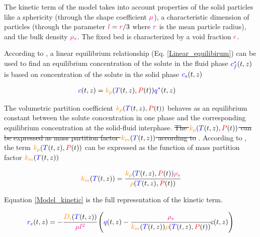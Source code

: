 \documentclass[../Article_Model_Parameters.tex]{subfiles}
\begin{document}
			{\color{blue} The kinetic term of the model takes into account properties of the solid particles like a sphericity (through the shape coefficient ${\color{magenta}\mu}$), a characteristic dimension of particles (through the parameter ${\color{magenta}l} = {\color{magenta}r}/3$ where ${\color{magenta}r}$ is the mean particle radius), and the bulk density ${\color{magenta}\rho_s}$. The fixed bed is characterized by a void fraction ${\color{magenta}\epsilon}$. }
			
			According to \citet{Bulley1984}, a linear equilibrium relationship (Eq.  \ref{Linear_equilibirum}) can be used to find an equilibrium concentration of the solute in the fluid phase ${\color{blue}c_f^*}(t,z)$ is based on concentration of the solute in the solid phase ${\color{blue}c_s}(t,z)$ 
			
			{\footnotesize
				\begin{align} \label{Linear_equilibirum}
					{\color{blue}c}(t,z) &= {\color{orange}k_p}({\color{blue}T}(t,z),{\color{red}P}(t)) \allowbreak {\color{blue}q^*}(t,z)
			\end{align} }
			
			The volumetric partition coefficient ${\color{orange}k_p}({\color{blue}T}(t,z),{\color{red}P}(t))$ behaves as an equilibrium constant between the solute concentration in one phase and the corresponding equilibrium concentration at the solid-fluid interphase. \sout{ The ${\color{orange}k_p}({\color{blue}T}(t,z),{\color{red}P}(t))$ can be expressed as mass partition factor ${\color{orange}k_m}({\color{blue}T}(t,z))$ according to} \citet{Spiro2007} .
			{\color{blue} According to \citet{Spiro2007}, the term ${\color{orange}k_p}({\color{blue}T}(t,z),{\color{red}P}(t))$ can be expressed as the function of mass partition factor ${\color{orange}k_m}({\color{blue}T}(t,z))$ } 
			
			{\footnotesize
				\begin{align}
					{\color{orange}k_m}({\color{blue}T}(t,z)) = \cfrac{{\color{orange}k_p}({\color{blue}T}(t,z),{\color{red}P}(t)) {\color{magenta}\rho_s}}{{\color{orange}\rho}({\color{blue}T}(t,z),{\color{red}P}(t))}
			\end{align} }
			
			Equation \ref{Model_kinetic} is the full representation of the kinetic term.
			
			{\footnotesize
				\begin{align}
					\label{Model_kinetic}
					{\color{blue}r_e}(t,z) = -\cfrac{{\color{orange}D_i}({\color{blue}T}(t,z))}{{\color{magenta} \mu l^2} }\left({\color{blue}q}(t,z) - \cfrac{{\color{magenta}\rho_s}}{{\color{orange}k_m}({\color{blue}T}(t,z)){\color{orange}\rho}({\color{blue}T}(t,z),{\color{red}P}(t))}  {\color{blue}c}(t,z) \right)
			\end{align} }
			
\end{document}
